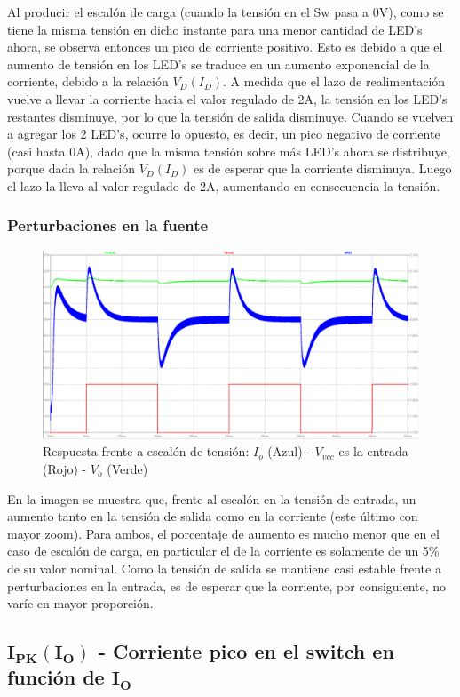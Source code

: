 \documentclass[e4_tp2_main.tex]{subfiles}
\begin{document}
Al producir el escalón de carga (cuando la tensión en el Sw pasa a 0V), como se tiene la misma tensión en dicho instante para una menor cantidad de LED's ahora, se observa entonces un pico de corriente positivo. Esto es debido a que el aumento de tensión en los LED's se traduce en un aumento exponencial de la corriente, debido a la relación $V_D(I_D)$. A medida que el lazo de realimentación vuelve a llevar la corriente hacia el valor regulado de 2A, la tensión en los LED's restantes disminuye, por lo que la tensión de salida disminuye. Cuando se vuelven a agregar los 2 LED's, ocurre lo opuesto, es decir, un pico negativo de corriente (casi hasta 0A), dado que la misma tensión sobre más LED's ahora se distribuye, porque dada la relación $V_D(I_D)$ es de esperar que la corriente disminuya. Luego el lazo la lleva al valor regulado de 2A, aumentando en consecuencia la tensión.

\subsubsection*{Perturbaciones en la fuente}
\begin{figure}[H]
\centering
\includegraphics[width=0.7\linewidth]{Imagenes/Punto2/fuentevariable-I-V.PNG}
\caption{Respuesta frente a escalón de tensión: $I_o$ (Azul) - $V_{vcc}$ es la entrada (Rojo) - $V_o$ (Verde)}
\end{figure}

En la imagen se muestra que, frente al escalón en la tensión de entrada, un aumento tanto en la tensión de salida como en la corriente (este último con mayor zoom). Para ambos, el porcentaje de aumento es mucho menor que en el caso de escalón de carga, en particular el de la corriente es solamente de un 5\% de su valor nominal. Como la tensión de salida se mantiene casi estable frente a perturbaciones en la entrada, es de esperar que la corriente, por consiguiente, no varíe en mayor proporción.

\newpage

\subsection{$\mathbf{I_{PK}(I_O)}$ - Corriente pico en el switch en función de $\mathbf{I_O}$}
\end{document}
